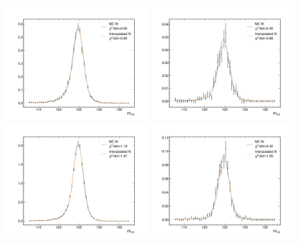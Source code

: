 \begin{figure}
  \centering
  \includegraphics[width=0.49\textwidth]{Figures/Dihiggs/signal/interpolation_check/graviton/interpolation_check_270_125_2018_0.pdf}
  \includegraphics[width=0.49\textwidth]{Figures/Dihiggs/signal/interpolation_check/graviton/interpolation_check_270_125_2018_1.pdf} \\
  \includegraphics[width=0.49\textwidth]{Figures/Dihiggs/signal/interpolation_check/graviton/interpolation_check_500_125_2018_0.pdf}
  \includegraphics[width=0.49\textwidth]{Figures/Dihiggs/signal/interpolation_check/graviton/interpolation_check_500_125_2018_1.pdf} \\

\end{figure}
